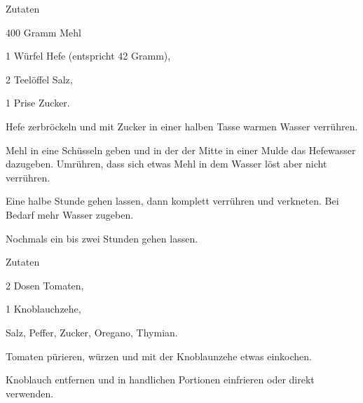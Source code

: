 \startsection[title={Pizza},reference=pizza]

\startsubsection[title=Teig (für 3 Bleche)]
\startitemize
\item Zutaten
      \startitemize
      \item 400 Gramm Mehl
      \item 1 Würfel Hefe (entspricht 42 Gramm),
      \item 2 Teelöffel Salz,
      \item 1 Prise Zucker.
      \stopitemize
\item Hefe zerbröckeln und mit Zucker in einer halben Tasse warmen
  Wasser verrühren.
\item Mehl in eine Schüsseln geben und in der der Mitte in einer Mulde
  das Hefewasser dazugeben. Umrühren, dass sich etwas Mehl in dem Wasser
  löst aber nicht verrühren.
\item Eine halbe Stunde gehen lassen, dann komplett verrühren und
  verkneten. Bei Bedarf mehr Wasser zugeben.
\item Nochmals ein bis zwei Stunden gehen lassen.
\stopitemize
\stopsubsection

\startsubsection[title=Soße]
\startitemize
\item Zutaten
      \startitemize
      \item 2 Dosen Tomaten,
      \item 1 Knoblauchzehe,
      \item Salz, Peffer, Zucker, Oregano, Thymian.
      \stopitemize
\item Tomaten pürieren, würzen und mit der Knoblaunzehe etwas einkochen.
\item Knoblauch entfernen und in handlichen Portionen einfrieren oder
  direkt verwenden.
\stopitemize
\stopsubsection

\stopsection
